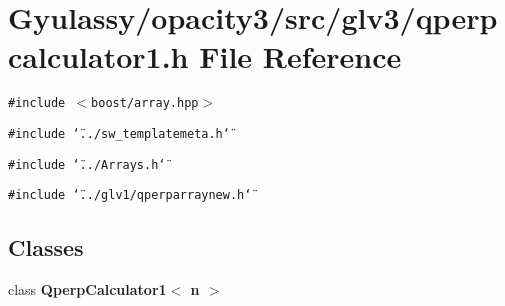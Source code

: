 \section{Gyulassy/opacity3/src/glv3/qperpcalculator1.h File Reference}
\label{qperpcalculator1_8h}
{\tt \#include $<$boost/array.hpp$>$}\par
{\tt \#include \char`\"{}../sw\_\-templatemeta.h\char`\"{}}\par
{\tt \#include \char`\"{}../Arrays.h\char`\"{}}\par
{\tt \#include \char`\"{}../glv1/qperparraynew.h\char`\"{}}\par
\subsection*{Classes}
\begin{CompactItemize}
\item 
class {\bf QperpCalculator1$<$ n $>$}
\end{CompactItemize}
